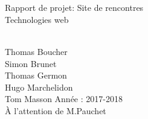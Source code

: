 \begin{titlepage}
\begin{sffamily}
\begin{center}

~\\[1cm]
\HRule
\\[0.5cm]
{\huge {\selectfont
 Rapport de projet: Site de rencontres \\[0.5cm]
Technologies web}}
\\[0.4cm]
\HRule
\end{center}



\\
Thomas Boucher \\
Simon Brunet \\
Thomas Germon \\
Hugo Marchelidon \\
Tom Masson  \hfill Année : 2017-2018\\
\hfill {\`A l'attention de M.Pauchet}

\end{sffamily}
\end{titlepage}
